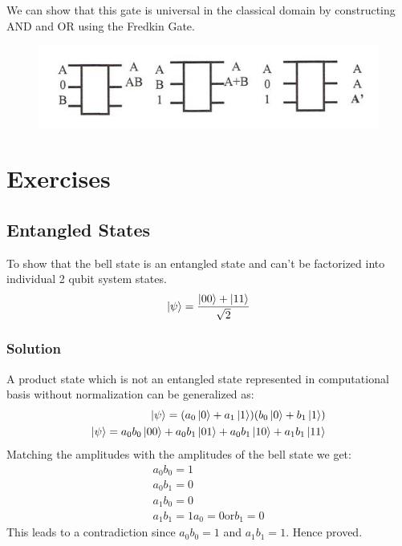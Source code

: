 \documentclass[11.5pt, paper=a4]{article}
\theoremstyle{definition}
\numberwithin{theorem}{section}
\begin{document}
We can show that this gate is universal in the classical domain by constructing AND and OR using the Fredkin Gate.

\begin{figure}[H]
    \centering
    \includegraphics[]{images/fredkin.jpg}
    \label{fig:my_label}
\end{figure}

\section*{Exercises}
\subsection{Entangled States}
To show that the bell state is an entangled state and can't be factorized into individual 2 qubit system states.
\begin{equation*}
    \ket{\psi} = \frac{\ket{00} + \ket{11}}{\sqrt{2}}
\end{equation*}
\subsubsection{Solution}
A product state which is not an entangled state represented in computational basis without normalization can be generalized as:
\begin{align*}
    \ket{\psi} = (a_0 \ket{0} + a_1 \ket{1})(b_0\ket{0} + b_1\ket{1}) \\
    \ket{\psi} = a_0 b_0\ket{00} + a_0 b_1\ket{01} + a_0 b_1\ket{10} + a_1 b_1\ket{11}
\end{align*}
Matching the amplitudes with the amplitudes of the bell state we get:
\begin{align*}
    a_0b_0 = 1 \\ a_0b_1 = 0 \\ a_1b_0 = 0 \\ a_1b_1 = 1
    a_0 = 0 \text{or} b_1 = 0
\end{align*}
This leads to a contradiction since $a_0b_0 = 1$ and $a_1b_1 = 1$. Hence proved.

\nocite{*}


\end{document}
